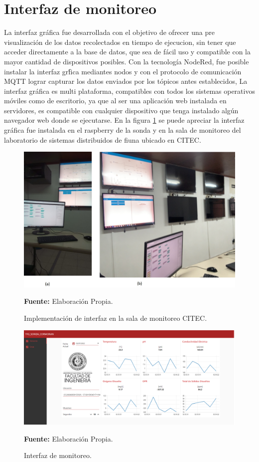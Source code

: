 \section{Interfaz de monitoreo}
La interfaz gr\'afica fue desarrollada con el objetivo de ofrecer una pre visualizaci\'on de los datos recolectados en tiempo de ejecucion, sin tener que acceder directamente a la base de datos, que sea de f\'acil uso y compatible con la mayor cantidad de dispositivos posibles.
Con la tecnolog\'ia NodeRed, fue posible instalar la interfaz gr\'fica mediantes nodos y con el protocolo de comunicaci\'on  MQTT lograr capturar los datos enviados por los t\'opicos antes  establecidos, 
La interfaz gr\'afica es multi plataforma, compatibles con todos los sistemas operativos m\'oviles como de escritorio, ya que al ser una aplicaci\'on web instalada en servidores, es compatible con cualquier dispositivo que tenga instalado alg\'un navegador web donde se ejecutarse. En la figura \ref{fig:Monitoreo} se puede apreciar la interfaz gráfica fue instalada en el raspberry de la sonda y en la sala de monitoreo del laboratorio de sistemas distribuidos de fiuna ubicado en CITEC. 
\begin{figure}[H]
        \centering
        \includegraphics[scale=0.7]{Imagenes/cap4/SalaMonitoreo.jpg}
        \caption {Implementaci\'on de interfaz en la sala de monitoreo CITEC. }{\textbf{Fuente:}
        Elaboraci\'on Propia. }
        \label{fig:Monitoreo}
\end{figure}


\begin{figure}[H]
        \centering
        \includegraphics[scale=0.88]{Imagenes/cap4/nodeRed.png}
        \caption {Interfaz de monitoreo. }{\textbf{Fuente:}
        Elaboraci\'on Propia. }
        \label{fig:interfaz}
\end{figure}

